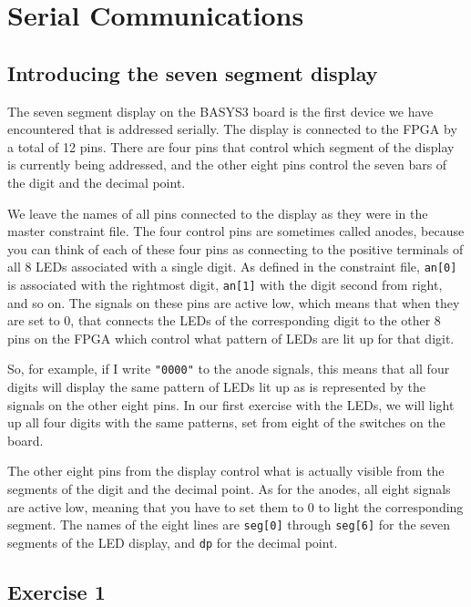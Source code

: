 \documentclass[../physical_computing.tex]{subfiles}
\begin{document}
\chapter{Serial Communications}
\label{sec:chapter_4}

\section{Introducing the seven segment display}
\label{sec:slow_clock}

The seven segment display on the BASYS3 board is the first device we have encountered that is addressed serially. The display is connected to the FPGA by a total of 12 pins. There are four pins that control which segment of the display is currently being addressed, and the other eight pins control the seven bars of the digit and the decimal point. 

We leave the names of all pins connected to the display as they were in the master constraint file. The four control pins are sometimes called anodes, because you can think of each of these four pins as connecting to the positive terminals of all 8 LEDs associated with a single digit. As defined in the constraint file, \texttt{an[0]} is associated with the rightmost digit, \texttt{an[1]} with the digit second from right, and so on. The signals on these pins are active low, which means that when they are set to $0$, that connects the LEDs of the corresponding digit to the other 8 pins on the FPGA which control what pattern of LEDs are lit up for that digit. 

So, for example, if I write \texttt{"0000"} to the anode signals, this means that all four digits will display the same pattern of LEDs lit up as is represented by the signals on the other eight pins. In our first exercise with the LEDs, we will light up all four digits with the same patterns, set from eight of the switches on the board.

The other eight pins from the display control what is actually visible from the segments of the digit and the decimal point. As for the anodes, all eight signals are active low, meaning that you have to set them to $0$ to light the corresponding segment. The names of the eight lines are \texttt{seg[0]} through \texttt{seg[6]} for the seven segments of the LED display, and \texttt{dp} for the decimal point. 

\section{Exercise 1}
\label{sec:lightson}
\end{document}
